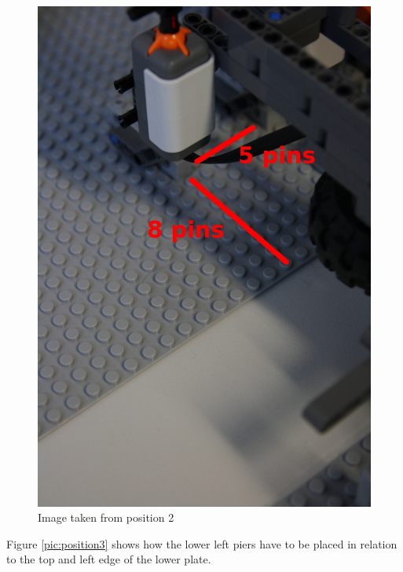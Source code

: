 \documentclass[%
  a4paper,%
  11pt,%
  blue,%
  hyperref	%
  ]{tubsartcl}
\begin{document}
\begin{figure}[!htb]
\begin{center}
\includegraphics[scale=0.35]{graphics_lego/position2.jpg}
\end{center}
\caption{Image taken from position 2}
\label{pic:position2}
\end{figure}

\clearpage

Figure \ref{pic:position3} shows how the lower left piers have to be placed in relation to the top and left edge of the lower plate.
\end{document}
